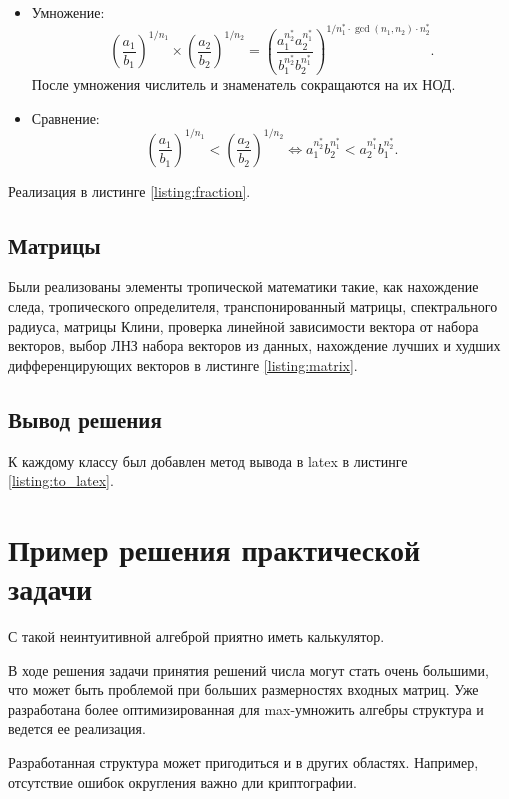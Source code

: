 \documentclass[specialist, substylefile = spbureport.rtx,
    subf,href,colorlinks=true, 12pt]{disser}
\begin{document}
    \begin{itemize}
        \item Умножение:
        $$ \left(\frac{a_1}{b_1}\right)^{1/n_1} \times \left(\frac{a_2}{b_2}\right)^{1/n_2} = \left(\frac{a_1^{n^*_2}a_2^{n^*_1}}{b_1^{n^*_2}b_2^{n^*_1}}\right)^{1/n^*_1\cdot \gcd(n_1, n_2) \cdot n^*_2}.$$
        После умножения числитель и знаменатель сокращаются на их НОД.
        \item Сравнение:
        $$ \left(\frac{a_1}{b_1}\right)^{1/n_1} < \left(\frac{a_2}{b_2}\right)^{1/n_2} \Leftrightarrow
        {a_1^{n^*_2}}{b_2^{n^*_1}} < {a_2^{n^*_1}}{b_1^{n^*_2}}.$$
    \end{itemize}

    Реализация в листинге \ref{listing:fraction}.


    \section{Матрицы}
    Были реализованы элементы тропической математики такие, как нахождение следа, тропического определителя, транспонированный матрицы, спектрального радиуса, матрицы Клини, проверка линейной зависимости вектора от набора векторов, выбор ЛНЗ набора векторов из данных, нахождение лучших и худших дифференцирующих векторов в листинге \ref{listing:matrix}.


    \section{Вывод решения}
    К каждому классу был добавлен метод вывода в latex в листинге \ref{listing:to_latex}.
    



    \chapter{Пример решения практической задачи}
        

    \conclusion

    С такой неинтуитивной алгеброй приятно иметь калькулятор.
    
    В ходе решения задачи принятия решений числа могут стать очень большими, что может быть проблемой при больших размерностях входных матриц. Уже разработана более оптимизированная для max-умножить алгебры структура и ведется ее реализация.

    Разработанная структура может пригодиться и в других областях. Например, отсутствие ошибок округления важно дли криптографии.
    
\end{document}
